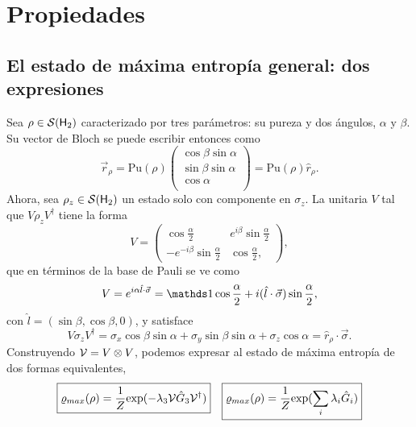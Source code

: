 \section{Propiedades}



\subsection{El estado de máxima entropía general: dos expresiones}
Sea $\rho\in\mathcal{S}({\sf H}_{2})$ caracterizado por tres parámetros: su pureza y dos ángulos, $\alpha$ y $\beta$. Su vector de Bloch se puede escribir entonces como
\begin{equation}
  \vec{r}_{\rho}=\text{Pu}(\rho)\begin{pmatrix}
    \cos{\beta}\sin{\alpha}\\
    \sin{\beta}\sin{\alpha}\\
    \cos{\alpha}\\
  \end{pmatrix}=\text{Pu}(\rho)\hat{r}_{\rho}.
\end{equation}
Ahora, sea $\rho_{z}\in\mathcal{S}({\sf H}_{2})$ un estado solo con componente en $\sigma_{z}$. La unitaria $V$ tal que $V\rho_{z} V^{\dag}$ tiene la forma
\begin{equation}
  V=
  \begin{pmatrix}
      \cos{\frac{\alpha}{2}} & e^{i\beta}\sin{\frac{\alpha}{2}}\\
      -e^{-i\beta}\sin{\frac{\alpha}{2}}& \cos{\frac{\alpha}{2}},
  \end{pmatrix},
\end{equation}
que en términos de la base de Pauli se ve como
\begin{equation}
  V=e^{i\alpha \hat{l}\cdot \vec{\sigma}}=\Id \cos{\frac{\alpha}{2}}+i(\hat{l}\cdot \vec{\sigma})\sin{\frac{\alpha}{2}},
\end{equation}
con $\hat{l}=(\sin{\beta},\cos{\beta},0)$, y satisface
\begin{equation}\label{eq:VsigmazV}
  V\sigma_{z}V^{\dag}=\sigma_{x}\cos{\beta}\sin{\alpha}+\sigma_{y}\sin{\beta}\sin{\alpha}+\sigma_{z}\cos{\alpha}=\hat{r}_{\rho}\cdot\vec{\sigma}.
\end{equation}
Construyendo $\mathcal{V}=V\otimes V$, podemos expresar al estado de máxima entropía de dos formas equivalentes,
\begin{align}\label{eq:MaxEntTwoExpr}
  \boxed{\varrho_{max}(\rho)=\frac{1}{Z}\text{exp}(-\lambda_{3}\mathcal{V}\hat{G}_{3}\mathcal{V}^{\dag})} && \boxed{\varrho_{max}(\rho)=\frac{1}{Z}\text{exp}(\sum_{i}\lambda_{i}\hat{G}_{i})}
\end{align}

